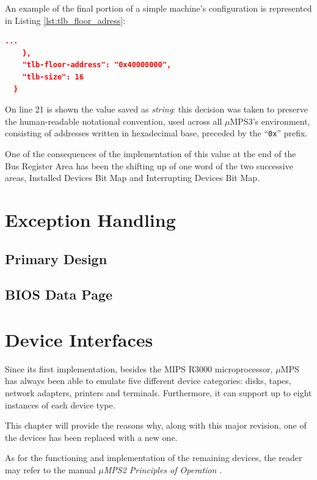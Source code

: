 \documentclass[12pt,a4paper,openright,twoside]{report}
\begin{document}
  An example of the final portion of a simple machine's configuration is represented in Listing \ref{lst:tlb_floor_adress}:
  \begin{lstlisting}[language=json,firstnumber=19,caption={TLB Floor Address},captionpos=b,label={lst:tlb_floor_adress}]
    ...
    },
    "tlb-floor-address": "0x40000000",
    "tlb-size": 16
  }
  \end{lstlisting}
  On line 21 is shown the value saved as \textit{string}: this decision was taken to preserve the human-readable notational convention, used across all $\mu$MPS3's environment, consisting of addresses written in hexadecimal base, preceded by the ``\texttt{0x}'' prefix.
  
  One of the consequences of the implementation of this value at the end of the Bus Register Area has been the shifting up of one word of the two successive areas, Installed Devices Bit Map and Interrupting Devices Bit Map.
  
\chapter{Exception Handling}
\label{chap:exception_handling}
\lhead[\fancyplain{}{\bfseries\thepage}]{\fancyplain{}{\bfseries\rightmark}}
\section{Primary Design}
\section{BIOS Data Page}
\label{chap:bios_data_page}
\lhead[\fancyplain{}{\bfseries\thepage}]{\fancyplain{}{\bfseries\rightmark}}
\chapter{Device Interfaces}
\lhead[\fancyplain{}{\bfseries\thepage}]{\fancyplain{}{\bfseries\rightmark}}
	Since its first implementation, besides the MIPS R3000 microprocessor, $\mu$MPS has always been able to emulate five different device categories: disks, tapes, network adapters, printers and terminals.
	Furthermore, it can support up to eight instances of each device type.

	This chapter will provide the reasons why, along with this major revision, one of the devices has been replaced with a new one.

	As for the functioning and implementation of the remaining devices, the reader may refer to the manual \textit{$\mu$MPS2 Principles of Operation} \cite{pops}.
	
\end{document}
